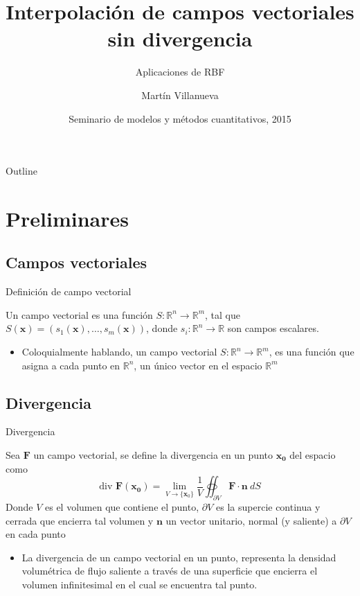 \documentclass{beamer}
\title{Interpolación de campos vectoriales sin divergencia}
\subtitle{Aplicaciones de RBF}
\author{Martín Villanueva\inst{1}}
\institute[Universidad Técnica Federico Santa María] %
{
  \inst{1}%
  Departamento de Informática\\
  Universidad Técnica Federico Santa María}
\date{Seminario de modelos y métodos cuantitativos, 2015}
\begin{document}
\begin{frame}
  \titlepage
\end{frame}



\begin{frame}{Outline}
  \tableofcontents
\end{frame}




\section{Preliminares}
\subsection{Campos vectoriales}

\begin{frame}{Definición de campo vectorial}
 
  \begin{definition}
    Un campo vectorial es una función $S:\mathbb{R}^n \rightarrow \mathbb{R}^m$, tal que
    $S(\mathbf{x})=(s_1(\mathbf{x}),\ldots,s_m(\mathbf{x}))$, donde $s_i: \mathbb{R}^n \rightarrow \mathbb{R}$
    son campos escalares.
  \end{definition}

  \begin{itemize}
  \item {
    Coloquialmente hablando, un campo vectorial $S:\mathbb{R}^n \rightarrow \mathbb{R}^m$, es una función
    que asigna a cada punto en $\mathbb{R}^n$, un único vector en el espacio $\mathbb{R}^m$
  }
  \end{itemize}
\end{frame}

\subsection{Divergencia}


\begin{frame}{Divergencia}
  \begin{definition}
    Sea $\mathbf{F}$ un campo vectorial, se define la divergencia en un punto $\mathbf{x_0}$ del espacio como
    $$
    \text{div }\mathbf{F}(\mathbf{x_0}) =
    \lim_{V \rightarrow \{\mathbf{x}_0\}} \frac{1}{V} \oiint_{\partial V} \mathbf{F} \cdot \mathbf{n} \ dS
    $$
    Donde $V$ es el volumen que contiene el punto, $\partial V$ es la supercie continua y cerrada que encierra
    tal volumen y $\mathbf{n}$ un vector unitario, normal (y saliente) a $\partial V$ en cada punto
  \end{definition}

  \begin{itemize}
  \item {
    La divergencia de un campo vectorial en un punto, representa la densidad volumétrica de flujo saliente a través de
    una superficie que encierra el volumen infinitesimal en el cual se encuentra tal punto.
  }
  \end{itemize}
\end{frame}
\end{document}
